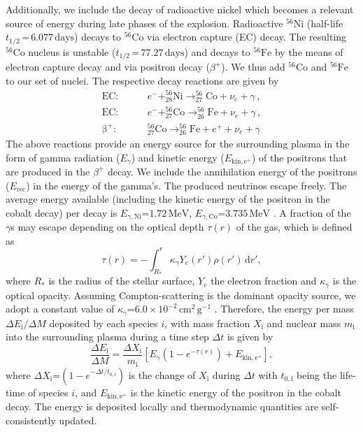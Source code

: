 \documentclass[fleqn,usenatbib]{mnras}
\newcommand{\ud}{\ensuremath{\mathrm{d}}\xspace}
\newcommand{\nickel}{\ensuremath{\mathrm{^{56}Ni}}\xspace}
\newcommand{\iron}{\ensuremath{\mathrm{^{56}Fe}}\xspace}
\newcommand{\cobalt}{\ensuremath{\mathrm{^{56}Co}}\xspace}
\begin{document}
Additionally, we include the decay of radioactive nickel which 
becomes a relevant source of energy during late phases of the explosion.
Radioactive \nickel 
(half-life $t_{1/2}\,\mathord{=}\,  6.077\, \mathrm{days}$) 
decays to \cobalt via electron capture (EC) decay. The resulting 
\cobalt nucleus is unstable ($t_{1/2}\,\mathord{=}\, 77.27\, \mathrm{days}$) 
and decays to \iron by the means of electron capture decay 
and via positron decay ($\beta^+$). We thus add \cobalt 
and \iron to our set of nuclei.
The respective decay reactions are given by
\begin{align*}
   \mathrm{EC:}&\qquad e^- + _{28}^{56}\mathrm{Ni} \rightarrow _{27}^{56}\mathrm{Co} + \nu_e + \gamma\, , \\
   \mathrm{EC:}&\qquad e^- + _{27}^{56}\mathrm{Co} \rightarrow _{26}^{56}\mathrm{Fe} + \nu_e + \gamma \, , \\
   \mathrm{\beta^+ :}&\qquad _{27}^{56}\mathrm{Co} \rightarrow _{26}^{56}\mathrm{Fe} + e^+ + \nu_e + \gamma
\end{align*}
The above reactions provide an energy source for the 
surrounding plasma in the form of gamma radiation ($E_{\gamma}$) 
and kinetic energy ($E_{\mathrm{kin,e^{+}}}$) of the positrons 
that are produced in the $\beta^+$ decay. We include the 
annihilation energy of the positrons ($E_{\mathrm{rec}}$) in 
the energy of the gamma's. The produced neutrinos escape freely.
The average energy available (including the kinetic energy 
of the positron in the cobalt decay) per decay is 
$E_{\gamma,\mathrm{Ni}}\mathord{=}1.72\,\mathrm{MeV}$, 
$E_{\gamma,\mathrm{Co}}\mathord{=}3.735\,\mathrm{MeV}$ \citep{Nadyozhin1994}.
A fraction of the $\gamma$s may escape depending on 
the optical depth $\tau(r)$ of the gas, which is defined as
\begin{equation}
    \tau(r) = -\int_{R_*}^{r} \kappa_{\gamma} Y_e(r') \rho(r')\, \ud r',
\end{equation}
where $R_*$ is the radius of the stellar surface, $Y_e$ 
the electron fraction and $\kappa_{\gamma}$ is the optical opacity. 
Assuming Compton-scattering is the dominant opacity source, we 
adopt a constant value of 
$\kappa_{\gamma}\mathord{=}6.0\,\mathord{\times}\, 10^{-2} \,\mathrm{cm^2\, g^{-1}}$ \citep{Swartz1995}.
Therefore, the energy per mass $\Delta E_{\mathrm{i}}/\Delta M$
deposited by each species $i$, with mass fraction 
$X_{\mathrm{i}}$ and 
nuclear mass $m_{\mathrm{i}}$ into the surrounding plasma during a 
time step $\Delta t$ is given by
\begin{equation}
        \frac{\Delta E_{\mathrm{i}}}{\Delta M} =  \frac{\Delta X_{\mathrm{i}}}{m_{\mathrm{i}}}
        \left[ E_{\gamma} \left( 1 - e^{-\tau(r)} \right) + E_{\mathrm{kin,e^{+}}}\right],
\end{equation}
where $\Delta X_{\mathrm{i}}\mathord{=}\left( 1 - e^{-\Delta t / t_{0,\mathrm{i}}} \right)$ is the change of $X_{\mathrm{i}}$ during $\Delta t$ with $t_{0,\mathrm{i}}$ being the life-time of species $i$, and $E_{\mathrm{kin,e^{+}}}$ is the kinetic energy of the positron in 
the cobalt decay. The energy is deposited locally and thermodynamic 
quantities are self-consistently updated.
\end{document}
